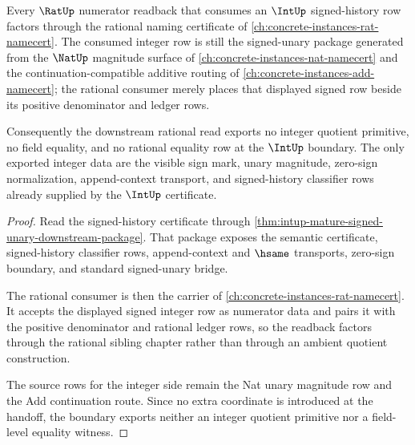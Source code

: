 \begin{theorem}
\label{thm:int-history-certificate-rat-sibling-scope}
Every $\RatUp$ numerator readback that consumes an $\IntUp$ signed-history row factors through the rational naming certificate of \autoref{ch:concrete-instances-rat-namecert}. The consumed integer row is still the signed-unary package generated from the $\NatUp$ magnitude surface of \autoref{ch:concrete-instances-nat-namecert} and the continuation-compatible additive routing of \autoref{ch:concrete-instances-add-namecert}; the rational consumer merely places that displayed signed row beside its positive denominator and ledger rows.

Consequently the downstream rational read exports no integer quotient primitive, no field equality, and no rational equality row at the $\IntUp$ boundary. The only exported integer data are the visible sign mark, unary magnitude, zero-sign normalization, append-context transport, and signed-history classifier rows already supplied by the $\IntUp$ certificate.
\end{theorem}
\begin{proof}
Read the signed-history certificate through \autoref{thm:intup-mature-signed-unary-downstream-package}. That package exposes the semantic certificate, signed-history classifier rows, append-context and $\hsame$ transports, zero-sign boundary, and standard signed-unary bridge.

The rational consumer is then the carrier of \autoref{ch:concrete-instances-rat-namecert}. It accepts the displayed signed integer row as numerator data and pairs it with the positive denominator and rational ledger rows, so the readback factors through the rational sibling chapter rather than through an ambient quotient construction.

The source rows for the integer side remain the Nat unary magnitude row and the Add continuation route. Since no extra coordinate is introduced at the handoff, the boundary exports neither an integer quotient primitive nor a field-level equality witness.
\end{proof}
